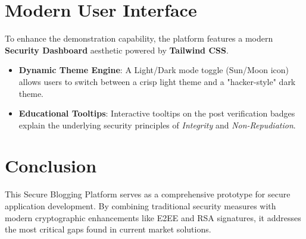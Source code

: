 \documentclass[12pt,a4paper]{article}
\begin{document}
\section{Modern User Interface}
To enhance the demonstration capability, the platform features a modern \textbf{Security Dashboard} aesthetic powered by \textbf{Tailwind CSS}.
\begin{itemize}
    \item \textbf{Dynamic Theme Engine}: A Light/Dark mode toggle (Sun/Moon icon) allows users to switch between a crisp light theme and a "hacker-style" dark theme.
    \item \textbf{Educational Tooltips}: Interactive tooltips on the post verification badges explain the underlying security principles of \textit{Integrity} and \textit{Non-Repudiation}.
\end{itemize}

\section{Conclusion}
This Secure Blogging Platform serves as a comprehensive prototype for secure application development. By combining traditional security measures with modern cryptographic enhancements like E2EE and RSA signatures, it addresses the most critical gaps found in current market solutions.
\end{document}
